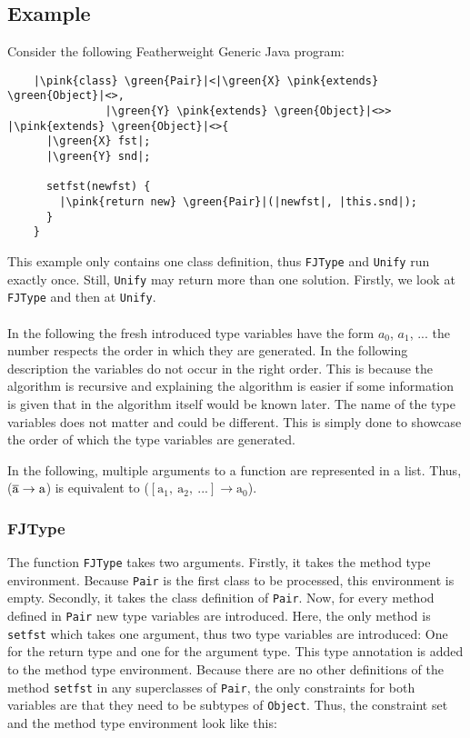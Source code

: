 \subsection{Example}

Consider the following Featherweight Generic Java program:

\begin{verbatim}
    |\pink{class} \green{Pair}|<|\green{X} \pink{extends} \green{Object}|<>,
               |\green{Y} \pink{extends} \green{Object}|<>> |\pink{extends} \green{Object}|<>{
      |\green{X} fst|;
      |\green{Y} snd|;

      setfst(newfst) {
        |\pink{return new} \green{Pair}|(|newfst|, |this.snd|);
      }
    }
\end{verbatim}

This example only contains one class definition, thus \verb|FJType| and \verb|Unify| run exactly once. Still, \verb|Unify| may return more than one solution.
Firstly, we look at \verb|FJType| and then at \verb|Unify|.
\\
\\
In the following the fresh introduced type variables have the form $a_0$, $a_1$, ... the number respects the order in which they are generated. In the following description the variables do not occur in the right order. This is because the algorithm is recursive and explaining the algorithm is easier
if some information is given that in the algorithm itself would be known later. The name of the type variables does not matter and could be different. This is simply done to showcase the order of which the type variables are generated.

In the following, multiple arguments to a function are represented in a list. Thus, ($\overline{\text{a}} \to \text{a}$) is equivalent to ($[\text{a}_1, \ \text{a}_2, \ ...] \to \text{a}_0$).

\subsubsection{FJType}
The function \verb|FJType| takes two arguments. Firstly, it takes the method type environment. Because \verb|Pair| is the first class to be processed, this environment is empty. Secondly, it takes the class definition of \verb|Pair|.
Now, for every method defined in \verb|Pair| new type variables are introduced. Here, the only method is \verb|setfst| which takes one argument, thus two type variables are introduced: One for the return type and one for the argument type. This type annotation is added to the method type environment.
Because there are no other definitions of the method \verb|setfst| in any superclasses of \verb|Pair|, the only constraints for both variables are that they need to be subtypes of \verb|Object|. Thus, the constraint set and the method type environment look like this:


